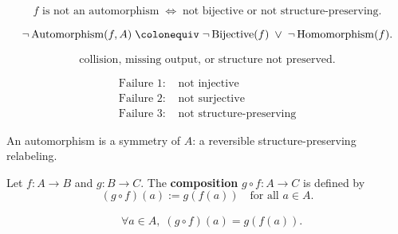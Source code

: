 \begin{remark*}
\[
f \text{ is not an automorphism}
\;\Longleftrightarrow\;
\text{not bijective or not structure-preserving}.
\]
\end{remark*}

\begin{remark*}
\[
\neg \operatorname{Automorphism}(f,A)
\;\colonequiv\;
\neg \operatorname{Bijective}(f)
\;\lor\;
\neg \operatorname{Homomorphism}(f).
\]
\end{remark*}

\begin{remark*}
\[
\text{collision, missing output, or structure not preserved}.
\]
\end{remark*}

\begin{remark*}
\[
\begin{aligned}
\text{Failure 1: } &\text{not injective} \\
\text{Failure 2: } &\text{not surjective} \\
\text{Failure 3: } &\text{not structure-preserving}
\end{aligned}
\]
\end{remark*}

\begin{remark*}[Interpretation]
An automorphism is a symmetry of $A$: a reversible structure-preserving relabeling.
\end{remark*}


\begin{tcolorbox}[title={Definition --- Composition}]
\begin{definition}[Composition]
\label{def:alg-composition}
Let $f : A \to B$ and $g : B \to C$. The \textbf{composition}
$g \circ f : A \to C$ is defined by
\[
(g \circ f)(a) := g(f(a)) \quad \text{for all } a \in A.
\]
\end{definition}
\end{tcolorbox}

\begin{remark*}
\[
\begin{aligned}
&\forall a \in A,\;
(g \circ f)(a) = g(f(a)).
\end{aligned}
\]
\end{remark*}

